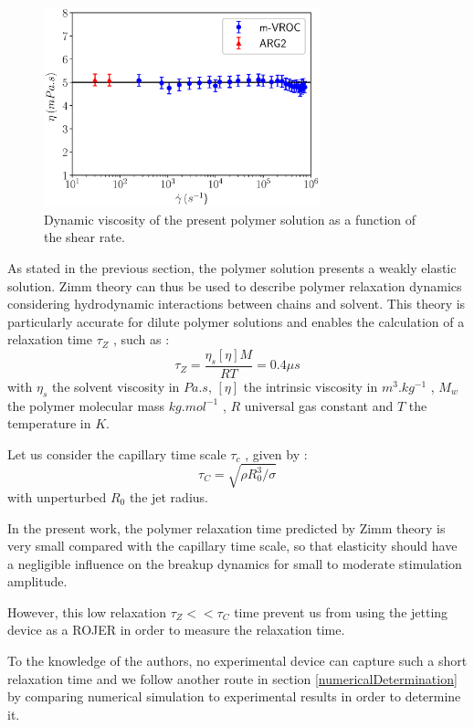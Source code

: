 \documentclass[twocolumn,10pt]{asme2ej}
\begin{document}
\begin{figure}[H]
    \centering
    \includegraphics[width=8cm]{./visco.eps}
    \caption{Dynamic viscosity of the present polymer solution as a function of the shear rate.}
    \label{beahaviorLaw}
\end{figure}

As stated in the previous section, the polymer solution presents a weakly elastic solution. Zimm theory can thus be used to describe polymer relaxation dynamics considering hydrodynamic interactions between chains and solvent. This theory is particularly accurate for dilute polymer solutions and enables the calculation of a relaxation time $\tau_Z$ , such as :
\begin{equation}
    \tau_Z = \frac{\eta_s [\eta] M}{RT} = 0.4 \mu s
    \label{zimm} 
\end{equation}
with $\eta_s$ the solvent viscosity in $Pa.s$, $[\eta]$ the intrinsic viscosity in $m^3.kg^{-1}$ , $M_w$ the
polymer molecular mass $kg.mol^{-1}$ , $R$ universal gas constant and $T$ the temperature in $K$.

Let us consider the capillary time scale $\tau_c$ , given by :
\begin{equation}
    \tau_C= \sqrt{\rho R_0^3 / \sigma}
\end{equation}
with unperturbed $R_0$ the jet radius. 

In the present work, the polymer relaxation time predicted by Zimm theory is very small compared with the capillary time scale, so that elasticity should have a negligible influence on the breakup dynamics for small to moderate stimulation amplitude. 

However, this low relaxation $\tau_Z<<\tau_C$ time prevent us from using the jetting device as a ROJER \cite{keshavarz2015studying} in order to measure the relaxation time. 

To the knowledge of the authors, no experimental device can capture such a short relaxation time and we follow another route in section \ref{numericalDetermination} by comparing numerical simulation to experimental results in order to determine it.
\end{document}
